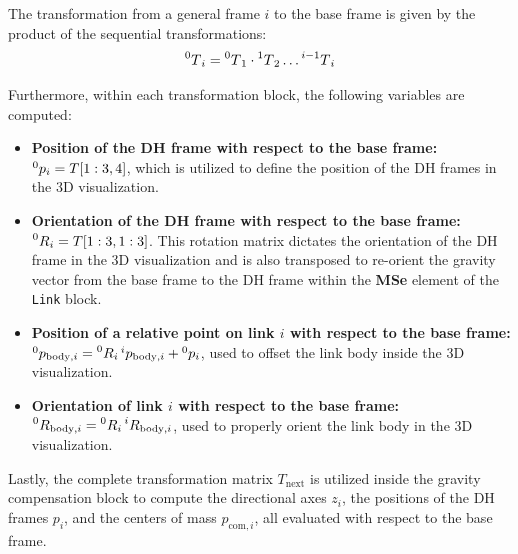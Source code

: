 The transformation from a general frame $i$ to the base frame is given by the product of the sequential transformations:
$$
\prescript{0}{}{T}_i = \prescript{0}{}{T}_1 \cdot \prescript{1}{}{T}_2 \dots \prescript{i-1}{}{T}_i 
$$

Furthermore, within each transformation block, the following variables are computed:

\begin{itemize}
  \item \textbf{Position of the DH frame with respect to the base frame:} $\prescript{0}{}{p}_i = T[1:3, 4]$, which is utilized to define the position of the DH frames in the 3D visualization. 
  \item \textbf{Orientation of the DH frame with respect to the base frame:} $\prescript{0}{}{R}_i = T[1:3, 1:3]$. This rotation matrix dictates the orientation of the DH frame in the 3D visualization and is also transposed to re-orient the gravity vector from the base frame to the DH frame within the \textbf{MSe} element of the \texttt{Link} block.
  \item \textbf{Position of a relative point on link $i$ with respect to the base frame:} $\prescript{0}{}{p}_{\text{body}, i} = \prescript{0}{}{R}_i \prescript{i}{}{p}_{\text{body}, i} + \prescript{0}{}{p}_i$, used to offset the link body inside the 3D visualization.
  \item \textbf{Orientation of link $i$ with respect to the base frame:} $\prescript{0}{}{R}_{\text{body}, i} = \prescript{0}{}{R}_i \prescript{i}{}{R}_{\text{body}, i}$, used to properly orient the link body in the 3D visualization.
\end{itemize}

Lastly, the complete transformation matrix $T_{\text{next}}$ is utilized inside the gravity compensation block to compute the directional axes $z_i$, the positions of the DH frames $p_i$, and the centers of mass $p_{\text{com}, i}$, all evaluated with respect to the base frame.